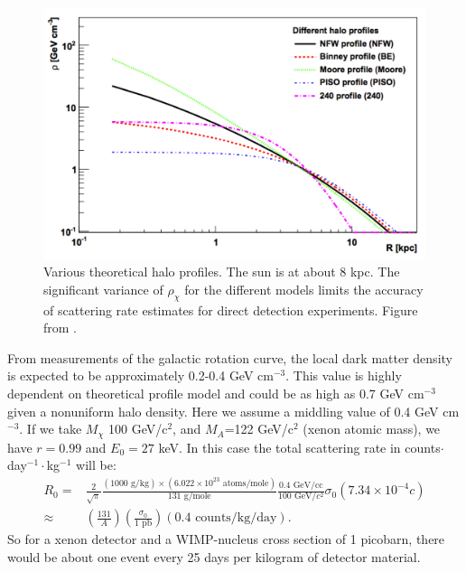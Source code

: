 \begin{figure}[h!]
\centering
\includegraphics[width=150mm]{Figures/DMprofiles.pdf}
\caption{Various theoretical halo profiles. The sun is at about 8 kpc. The significant variance of $\rho_{\chi}$ for the different models limits the accuracy of scattering rate estimates for direct detection experiments. Figure from \cite{weber}.}
\label{fig:WIMPprofiles} 
\end{figure}
From measurements of the galactic rotation curve, the local dark matter density is expected to be approximately 0.2-0.4 GeV cm$^{-3}$. This value is highly dependent on theoretical profile model and could be as high as 0.7 GeV cm$^{-3}$ given a nonuniform halo density\cite{weber}. Here we assume a middling value of 0.4 GeV cm$^{-3}$. If we take $M_{\chi}$ 100 GeV/c$^2$, and $M_A$=122 GeV/c$^2$ (xenon atomic mass), we have $r=0.99$ and $E_0=27$ keV. In this case the total scattering rate in counts$\cdot$ day$^{-1}\cdot$kg$^{-1}$ will be:
\begin{equation}
\begin{split}
R_0=& \frac{2}{\sqrt{\pi}}\frac{(1000 \text{\ g/kg})\times (6.022\times 10^{23}\text{\ atoms/mole})}{131 \text{\ g/mole}}\frac{0.4 \text{\ GeV/cc}}{100 \text{\ GeV}/c^2}\sigma_0 (7.34 \times 10^{-4}c)\\
\approx&\left( \frac{131}{A} \right)\left( \frac{\sigma_0}{1 \text{\ pb}} \right)(0.4 \text{\ counts/kg/day}).
\end{split}
\end{equation}
So for a xenon detector and a WIMP-nucleus cross section of 1 picobarn, there would be about one event every 25 days per kilogram of detector material.

